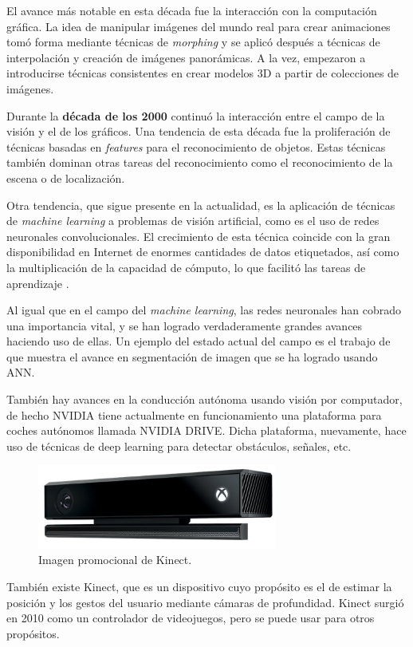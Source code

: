El avance más notable en esta década fue la interacción con la computación gráfica. La idea de manipular imágenes del mundo real para crear animaciones tomó forma mediante técnicas de \textit{morphing} y se aplicó después a técnicas de interpolación y creación de imágenes panorámicas. A la vez, empezaron a introducirse técnicas consistentes en crear modelos 3D a partir de colecciones de imágenes.

Durante la \textbf{década de los 2000} continuó la interacción entre el campo de la visión y el de los gráficos. Una tendencia de esta década fue la proliferación de técnicas basadas en \textit{features} para el reconocimiento de objetos. Estas técnicas también dominan otras tareas del reconocimiento como el reconocimiento de la escena o de localización.

Otra tendencia, que sigue presente en la actualidad, es la aplicación de técnicas de \textit{machine learning} a problemas de visión artificial, como es el uso de redes neuronales convolucionales. El crecimiento de esta técnica coincide con la gran disponibilidad en Internet de enormes cantidades de datos etiquetados, así como la multiplicación de la capacidad de cómputo, lo que facilitó las tareas de aprendizaje \citep{book:szeliski}.

Al igual que en el campo del \textit{machine learning}, las redes neuronales han cobrado una importancia vital, y se han logrado verdaderamente grandes avances haciendo uso de ellas. Un ejemplo del estado actual del campo es el trabajo de \citet{art:2017arXiv170306870H} que muestra el avance en segmentación de imagen que se ha logrado usando ANN.

También hay avances en la conducción autónoma usando visión por computador, de hecho NVIDIA tiene actualmente en funcionamiento una plataforma para coches autónomos llamada NVIDIA DRIVE. Dicha plataforma, nuevamente, hace uso de técnicas de deep learning para detectar obstáculos, señales, etc.

\begin{figure}
    \centering
    \label{fig:kinect}
    \includegraphics[width=0.7\textwidth]{images/kinect}
    \caption{Imagen promocional de Kinect.}
\end{figure}

También existe Kinect, que es un dispositivo cuyo propósito es el de estimar la posición y los gestos del usuario mediante cámaras de profundidad. Kinect surgió en 2010 como un controlador de videojuegos, pero se puede usar para otros propósitos.
\newpage